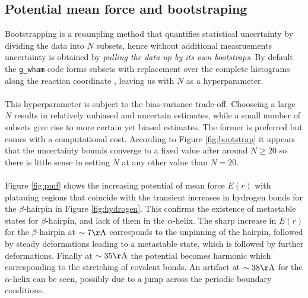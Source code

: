 \documentclass{article}[12pt]
\numberwithin{equation}{section}
\def\code#1{\texttt{#1}}
\begin{document}
\subsection{Potential mean force and bootstraping}
Bootstrapping is a resampling method that quantifies statistical uncertainty by
dividing the data into $N$ subsets, hence without additional measruements
uncertainty is obtained by \textit{pulling the data up by its own bootstraps}.
By default the \code{g\_wham} code forms subsets with replacement over the
complete histograms along the reaction coordinate \cite{gwham2010}, leaving us
with $N$ as a hyperparameter.
\\\\
This hyperparameter is subject to the bias-variance trade-off. Chooseing a large
$N$ results in relatively unbiased and uncertain estimates, while a small number
of subsets give rise to more certain yet biased estimates. The former is
preferred but comes with a computational cost. According to Figure
\ref{fig:bootstrap} it appears that the uncertainty bounds converge to a fixed
value after around $N\geq20$ so there is little sense in setting $N$ at any
other value than $N=20$.
\\\\
Figure \ref{fig:pmf} shows the increasing potential of mean force $E(r)$ with
platauing regions that coincide with the transient increases in hydrogen bonds
for the $\beta$-hairpin
in Figure \ref{fig:hydrogen}. This confirms the existence of metastable states for
$\beta$-hairpin, and lack of them in the $\alpha$-helix.
The sharp increase in $E(r)$ for the $\beta$-hairpin at $\sim7\mathrm{\AA}$
corresponds to the unpinning of the hairpin, followed by steady deformations
leading to a metastable state, which is followed by further deformations. Finally at
$\sim35\mathrm{\AA}$ the potential becomes harmonic which corresponding to the
stretching of covalent bonds. An artifact at $\sim38\mathrm{\AA}$ for the
$\alpha$-helix can be seen, possibly due to a jump across the periodic boundary
conditions.
\end{document}
